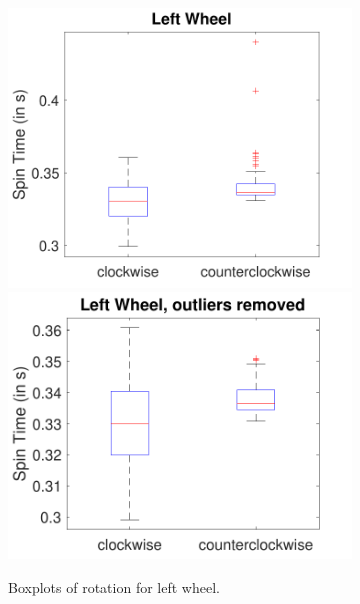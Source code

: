 \documentclass[a4paper,twoside]{book}
\begin{document}
\begin{figure}[h]
  \begin{subfigure}[t]{0.5\textwidth}
  \includegraphics[width=\textwidth, center]{img/left} 
  \includegraphics[width=\textwidth, center]{img/left_2}
  \caption{Boxplots of rotation for left wheel.}
  \end{subfigure}
  \begin{subfigure}[t]{0.5\textwidth} 

\end{subfigure}
\end{figure}
\end{document}
